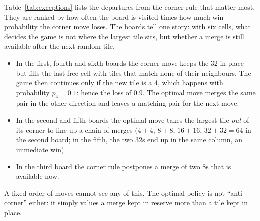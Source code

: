 \documentclass[11pt,a4paper]{article}
\theoremstyle{remark}
\begin{document}
Table~\ref{tab:exceptions} lists the departures from the corner rule that matter most. They are ranked by how often the board is visited times how much win probability the corner move loses. The boards tell one story: with six cells, what decides the game is not where the largest tile sits, but whether a merge is still available after the next random tile.
\begin{itemize}[leftmargin=*]
\item In the first, fourth and sixth boards the corner move keeps the 32 in place but fills the last free cell with tiles that match none of their neighbours. The game then continues only if the new tile is a 4, which happens with probability $p_4=0.1$: hence the loss of 0.9. The optimal move merges the same pair in the other direction and leaves a matching pair for the next move.
\item In the second and fifth boards the optimal move takes the largest tile \emph{out} of its corner to line up a chain of merges ($4+4$, $8+8$, $16+16$, $32+32=64$ in the second board; in the fifth, the two 32s end up in the same column, an immediate win).
\item In the third board the corner rule postpones a merge of two 8s that is available now.
\end{itemize}
A fixed order of moves cannot see any of this. The optimal policy is not ``anti-corner'' either: it simply values a merge kept in reserve more than a tile kept in place.
\end{document}
